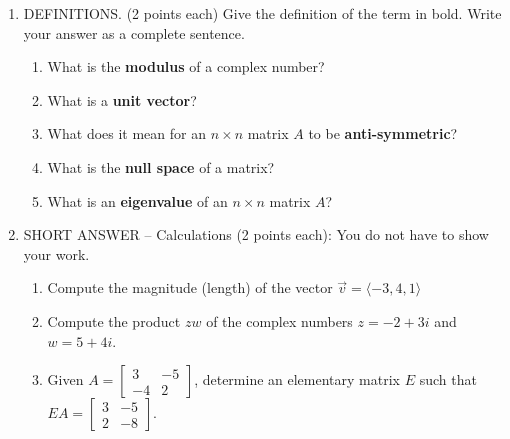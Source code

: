 \documentclass[12pt]{article}
\newcommand{\bbm}{\begin{bmatrix}}
\newcommand{\ebm}{\end{bmatrix}}
\begin{document}
\begin{enumerate}
\item DEFINITIONS. (2 points each) Give the definition of the term in bold. Write your answer as a complete sentence. 

\begin{enumerate}
 \item What is the \textbf{modulus} of a complex number?

\vspace{1.3in}

 \item What is a \textbf{unit vector}?

\vspace{1.3in}

 \item What does it mean for an $n\times n$ matrix $A$ to be \textbf{anti-symmetric}?

\vspace{1.3in}

 \item What is the \textbf{null space} of a matrix?

\vspace{1.3in}

 \item What is an \textbf{eigenvalue} of an $n\times n$ matrix $A$?


 
\end{enumerate}
\newpage

\item SHORT ANSWER -- Calculations (2 points each): You do not have to show your work.

\begin{enumerate}
 \item Compute the magnitude (length) of the vector $\vec{v} = \langle -3,4,1\rangle$

\vspace{1.5in}

 \item Compute the product $zw$ of the complex numbers $z=-2+3i$  and $w=5+4i$.

\vspace{1.5in}

 

 \item Given $A = \bbm 3&-5\\-4&2\ebm$, determine an elementary matrix $E$ such that $EA = \bbm 3&-5\\2&-8\ebm$.


\end{enumerate}
\end{enumerate}
\end{document}
